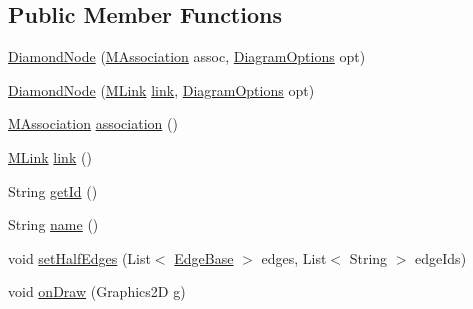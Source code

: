 \subsection*{Public Member Functions}
\begin{DoxyCompactItemize}
\item 
\hyperlink{classorg_1_1tzi_1_1use_1_1gui_1_1views_1_1diagrams_1_1elements_1_1_diamond_node_a6cf5aa9140dab3989c26cbe2e79a5589}{Diamond\-Node} (\hyperlink{interfaceorg_1_1tzi_1_1use_1_1uml_1_1mm_1_1_m_association}{M\-Association} assoc, \hyperlink{classorg_1_1tzi_1_1use_1_1gui_1_1views_1_1diagrams_1_1_diagram_options}{Diagram\-Options} opt)
\item 
\hyperlink{classorg_1_1tzi_1_1use_1_1gui_1_1views_1_1diagrams_1_1elements_1_1_diamond_node_a00e05869803e199f934929ccaa3b27de}{Diamond\-Node} (\hyperlink{interfaceorg_1_1tzi_1_1use_1_1uml_1_1sys_1_1_m_link}{M\-Link} \hyperlink{classorg_1_1tzi_1_1use_1_1gui_1_1views_1_1diagrams_1_1elements_1_1_diamond_node_a6221c04e144230d2bdc57b24aaaf82c8}{link}, \hyperlink{classorg_1_1tzi_1_1use_1_1gui_1_1views_1_1diagrams_1_1_diagram_options}{Diagram\-Options} opt)
\item 
\hyperlink{interfaceorg_1_1tzi_1_1use_1_1uml_1_1mm_1_1_m_association}{M\-Association} \hyperlink{classorg_1_1tzi_1_1use_1_1gui_1_1views_1_1diagrams_1_1elements_1_1_diamond_node_aab16e57fd879d5aed22d32428bb2c1d2}{association} ()
\item 
\hyperlink{interfaceorg_1_1tzi_1_1use_1_1uml_1_1sys_1_1_m_link}{M\-Link} \hyperlink{classorg_1_1tzi_1_1use_1_1gui_1_1views_1_1diagrams_1_1elements_1_1_diamond_node_a6221c04e144230d2bdc57b24aaaf82c8}{link} ()
\item 
String \hyperlink{classorg_1_1tzi_1_1use_1_1gui_1_1views_1_1diagrams_1_1elements_1_1_diamond_node_af1c3c1876e9379c0273d67a4491dd852}{get\-Id} ()
\item 
String \hyperlink{classorg_1_1tzi_1_1use_1_1gui_1_1views_1_1diagrams_1_1elements_1_1_diamond_node_ade4565d866fac9d644aed94c7bf3d8d8}{name} ()
\item 
void \hyperlink{classorg_1_1tzi_1_1use_1_1gui_1_1views_1_1diagrams_1_1elements_1_1_diamond_node_a34e7788cb374f0d0ad6af64b39dad038}{set\-Half\-Edges} (List$<$ \hyperlink{classorg_1_1tzi_1_1use_1_1gui_1_1views_1_1diagrams_1_1elements_1_1edges_1_1_edge_base}{Edge\-Base} $>$ edges, List$<$ String $>$ edge\-Ids)
\item 
void \hyperlink{classorg_1_1tzi_1_1use_1_1gui_1_1views_1_1diagrams_1_1elements_1_1_diamond_node_ac3729eea0eaefc07b90278a4cfc66c4f}{on\-Draw} (Graphics2\-D g)

\end{DoxyCompactItemize}
